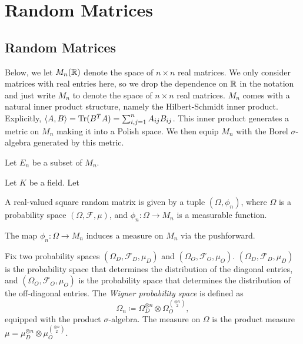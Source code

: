 \chapter{Random Matrices}

\section{Random Matrices}

Below, we let $M_n(\mathbb{R})$ denote the space of $n \times n$ real matrices. We only consider matrices with real entries here, so we drop the
dependence on $\mathbb{R}$ in the notation and just write $M_n$ to denote the space of $n \times n$ real matrices. $M_n$ comes with a natural inner product structure, namely the Hilbert-Schmidt inner product.
Explicitly, $\langle A, B\rangle = \operatorname{Tr}(B^{T}A) = \sum_{i, j = 1}^n A_{ij}B_{ij}$. This inner product generates a metric on $M_n$ making it into a Polish space.
We then equip $M_n$ with the Borel $\sigma$-algebra generated by this metric.

Let $E_n$ be a subset of $M_n$.

Let $K$ be a field. Let

\begin{definition}
  \label{def:realValuedSquareRandomMatrix}
  \notready
  A real-valued square random matrix is given by a tuple $(\Omega, \phi_n)$, where $\Omega$ is a probability space $(\Omega, \mathcal{F}, \mu)$, and $\phi_n: \Omega \to M_n$ is a measurable function.
\end{definition}

\begin{definition}
  \label{def:realValuedSquareRandomMatrix_pushforward_measure}
  \notready
  The map $\phi_n:\Omega \to M_n$ induces a measure on $M_n$ via the pushforward.
\end{definition}

\begin{definition}
  \label{def:WignerNbyNProbabilitySpace}
  \notready
  Fix two probability spaces $(\Omega_D, \mathcal{F}_D, \mu_D)$ and $(\Omega_O, \mathcal{F}_O, \mu_O)$.
  $(\Omega_D, \mathcal{F}_D, \mu_D)$ is the probability space that determines the distribution of the diagonal entries, and $(\Omega_O,\mathcal{F}_O, \mu_O)$ is the probability space that determines the distribution of the off-diagonal entries.
  The \textit{Wigner probability space} is defined as
  \[
  \Omega_n \coloneqq \Omega_D^{\otimes n} \otimes \Omega_O^{\otimes n \choose 2},
  \]
  equipped with the product $\sigma$-algebra. The measure on $\Omega$ is the product measure $\mu = \mu_D^{\otimes n} \otimes \mu_O^{\otimes n \choose 2}$.
\end{definition}

